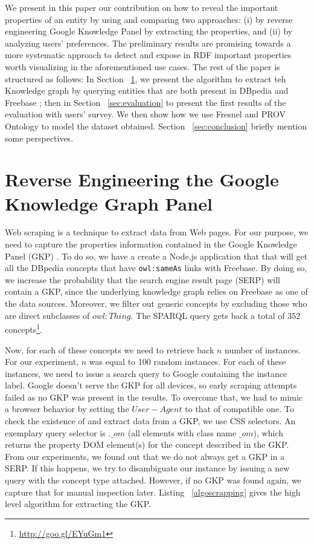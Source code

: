 \documentclass[runningheads,a4paper]{llncs}
\begin{document}
  We present in this paper our contribution on how to reveal the important properties of an entity by using and comparing two approaches: (i) by reverse engineering Google Knowledge Panel by extracting the properties, and (ii) by analyzing users' preferences. The preliminary results are promising towards a more systematic approach to detect and expose in RDF important properties worth visualizing in the aforementioned use cases.
  The rest of the paper is structured as follows: In Section ~\ref{sec:knowledge-graph}, we present the algorithm to extract teh Knowledge graph by querying entities that are both present in DBpedia and Freebase ; then in Section ~\ref{sec:evaluation} to present the first results of the evaluation with users' survey. We then show how we use Fresnel and PROV Ontology to model the dataset obtained. Section ~\ref{sec:conclusion} briefly mention some perspectives.

\section{Reverse Engineering the Google Knowledge Graph Panel}
\label{sec:knowledge-graph}

Web scraping is a technique to extract data from Web pages. For our purpose, we need to capture the properties information contained in the Google Knowledge Panel (GKP) \cite{Bergman2012}. To do so, we have a create a Node.js application that that will get all the DBpedia concepts that have \texttt{owl:sameAs} links with Freebase. By doing so, we increase the probability that the search engine result page (SERP) will contain a GKP, since the underlying knowledge graph relies on Freebase as one of the data sources. Moreover, we filter out generic concepts by excluding those who are direct subclasses of $owl:Thing$. The SPARQL query gets back a total of $352$ concepts\footnote{\url{http://goo.gl/EYuGm1}}.

Now, for each of these concepts we need to retrieve back $n$ number of instances. For our experiment, $n$ was equal to 100 random instances. For each of these instances, we need to issue a search query to Google containing the instance label. Google doesn't serve the GKP for all devices, so early scraping attempts failed as no GKP was present in the results. To overcome that, we had to mimic a browser behavior by setting the $User-Agent$ to that of compatible one.
To check the existence of and extract data from a GKP, we use CSS selectors. An exemplary query selector is $.\_om$ (all elements with class name $\_om$), which returns the property DOM element(s) for the concept described in the GKP. From our experiments, we found out that we do not always get a GKP in a SERP. If this happens, we try to disambiguate our instance by issuing a new query with the concept type attached. However, if no GKP was found again, we capture that for manual inspection later. Listing ~\ref{algoscrapping} gives the high level algorithm for extracting the GKP.
\end{document}
